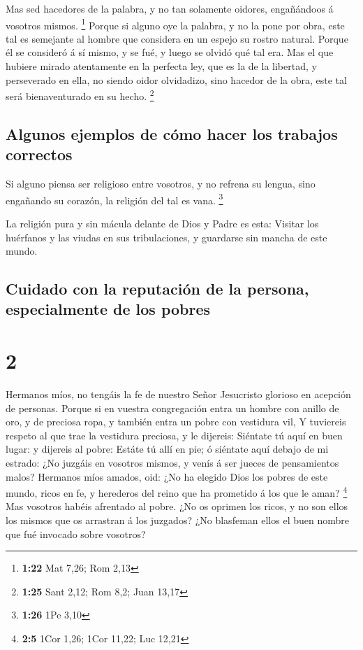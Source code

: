  Mas sed hacedores de la palabra, y no tan solamente
oidores, engañándoos á vosotros mismos. \footnote{\textbf{1:22} Mat
  7,26; Rom 2,13}  Porque si alguno oye la palabra, y no la
pone por obra, este tal es semejante al hombre que considera en un
espejo su rostro natural.  Porque él se consideró á sí
mismo, y se fué, y luego se olvidó qué tal era.  Mas el que
hubiere mirado atentamente en la perfecta ley, que es la de la libertad,
y perseverado en ella, no siendo oidor olvidadizo, sino hacedor de la
obra, este tal será bienaventurado en su hecho. \footnote{\textbf{1:25}
  Sant 2,12; Rom 8,2; Juan 13,17}

\hypertarget{algunos-ejemplos-de-cuxf3mo-hacer-los-trabajos-correctos}{%
\subsection{Algunos ejemplos de cómo hacer los trabajos
correctos}\label{algunos-ejemplos-de-cuxf3mo-hacer-los-trabajos-correctos}}

 Si alguno piensa ser religioso entre vosotros, y no
refrena su lengua, sino engañando su corazón, la religión del tal es
vana. \footnote{\textbf{1:26} 1Pe 3,10}

 La religión pura y sin mácula delante de Dios y Padre es
esta: Visitar los huérfanos y las viudas en sus tribulaciones, y
guardarse sin mancha de este mundo.

\hypertarget{cuidado-con-la-reputaciuxf3n-de-la-persona-especialmente-de-los-pobres}{%
\subsection{Cuidado con la reputación de la persona, especialmente de
los
pobres}\label{cuidado-con-la-reputaciuxf3n-de-la-persona-especialmente-de-los-pobres}}

\hypertarget{section-1}{%
\section{2}\label{section-1}}

 Hermanos míos, no tengáis la fe de nuestro Señor Jesucristo
glorioso en acepción de personas.  Porque si en vuestra
congregación entra un hombre con anillo de oro, y de preciosa ropa, y
también entra un pobre con vestidura vil,  Y tuviereis
respeto al que trae la vestidura preciosa, y le dijereis: Siéntate tú
aquí en buen lugar: y dijereis al pobre: Estáte tú allí en pie; ó
siéntate aquí debajo de mi estrado:  ¿No juzgáis en vosotros
mismos, y venís á ser jueces de pensamientos malos? 
Hermanos míos amados, oid: ¿No ha elegido Dios los pobres de este mundo,
ricos en fe, y herederos del reino que ha prometido á los que le aman?
\footnote{\textbf{2:5} 1Cor 1,26; 1Cor 11,22; Luc 12,21} 
Mas vosotros habéis afrentado al pobre. ¿No os oprimen los ricos, y no
son ellos los mismos que os arrastran á los juzgados?  ¿No
blasfeman ellos el buen nombre que fué invocado sobre vosotros?

